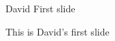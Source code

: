 \begin{frame}{David First slide}
\begin{block}{}
  This is David's first slide
\end{block}
\end{frame}